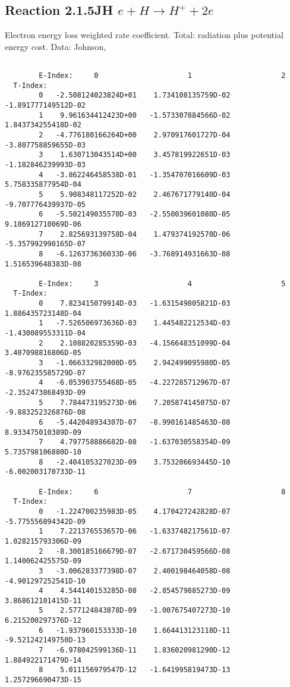 \documentclass[12pt,dvipdfmx]{article}
\begin{document}
{\subsection{
Reaction 2.1.5JH  $ e + H \rightarrow H^+ + 2e $
}

Electron energy loss weighted rate coefficient.
Total: radiation plus potential energy cost. Data: Johnson, \cite{kn:Mahn}

\begin{small}\begin{verbatim}

        E-Index:     0                     1                     2
  T-Index:
        0   -2.508124023824D+01    1.734108135759D-02   -1.891777149512D-02
        1    9.961634412423D+00   -1.573307884566D-02    1.843734255418D-02
        2   -4.776180166264D+00    2.970917601727D-04   -3.807758859655D-03
        3    1.630713043514D+00    3.457819922651D-03   -1.182846239993D-03
        4   -3.862246458538D-01   -1.354707016609D-03    5.758335877954D-04
        5    5.908348117252D-02    2.467671779140D-04   -9.707776439937D-05
        6   -5.502149035570D-03   -2.550039601080D-05    9.186912710069D-06
        7    2.825693139758D-04    1.479374192570D-06   -5.357992990165D-07
        8   -6.126373636033D-06   -3.768914931663D-08    1.516539648383D-08

        E-Index:     3                     4                     5
  T-Index:
        0    7.823415079914D-03   -1.631549805821D-03    1.886435723148D-04
        1   -7.526506973636D-03    1.445482212534D-03   -1.430089553311D-04
        2    2.108820285359D-03   -4.156648351099D-04    3.407098816806D-05
        3   -1.066332982000D-05    2.942499095980D-05   -8.976235585729D-07
        4   -6.053903755468D-05   -4.227285712967D-07   -2.352473868493D-09
        5    7.784473195273D-06    7.205874145075D-07   -9.883252326876D-08
        6   -5.442048934307D-07   -8.990161485463D-08    8.933475010389D-09
        7    4.797758886682D-08   -1.637030558354D-09    5.735798106880D-10
        8   -2.404105327023D-09    3.753206693445D-10   -6.002003170733D-11

        E-Index:     6                     7                     8
  T-Index:
        0   -1.224700235983D-05    4.170427242828D-07   -5.775556894342D-09
        1    7.221376553657D-06   -1.633748217561D-07    1.028215793306D-09
        2   -8.300185166679D-07   -2.671730459566D-08    1.140062425575D-09
        3   -3.006283377398D-07    2.400198464058D-08   -4.901297252541D-10
        4    4.544140153285D-08   -2.854579885273D-09    3.868612101415D-11
        5    2.577124843878D-09   -1.007675407273D-10    6.215200297376D-12
        6   -1.937960153333D-10    1.664413123118D-11   -9.521242149750D-13
        7   -6.978042599136D-11    1.836020981290D-12    1.884922171479D-14
        8    5.011156979547D-12   -1.641995819473D-13    1.257296690473D-15


\end{verbatim}
\end{small}}
\end{document}
